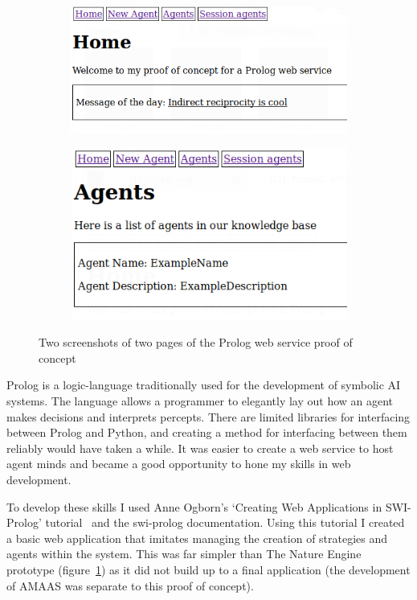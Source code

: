 \documentclass[]{final_report}
\begin{document}
\begin{figure}
\begin{framed}
\begin{subfigure}{.55\textwidth}
	\begin{center}
	\includegraphics[width=\linewidth]{PrologServiceProof1.png}
	\end{center}
\end{subfigure}
\begin{subfigure}{.45\textwidth}
	\begin{center}
	\includegraphics[width=\linewidth]{PrologServiceProof2.png}
	\end{center}
\end{subfigure}
\end{framed}
\caption{Two screenshots of two pages of the Prolog web service proof of concept}
\label{fig:prologproof}
\end{figure}
Prolog is a logic-language traditionally used for the development of symbolic AI systems. The language allows a programmer to elegantly lay out how an agent makes decisions and interprets percepts. There are limited libraries for interfacing between Prolog and Python, and creating a method for interfacing between them reliably would have taken a while. It was easier to create a web service to host agent minds and became a good opportunity to hone my skills in web development.\par 
To develop these skills I used Anne Ogborn's `Creating Web Applications in SWI-Prolog' tutorial~\cite{swi_web_tut} and the swi-prolog documentation. Using this tutorial I created a basic web application that imitates managing the creation of strategies and agents within the system. This was far simpler than The Nature Engine prototype (figure~\ref{fig:prologproof}) as it did not build up to a final application (the development of AMAAS was separate to this proof of concept).
\end{document}
